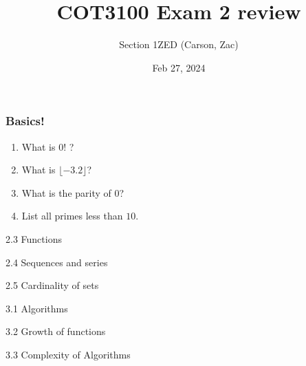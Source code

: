 \documentclass{beamer}
\title{COT3100 Exam 2 review}
\author{Section 1ZED (Carson, Zac)}
\date{Feb 27, 2024}
\begin{document}
\frame{\titlepage}

\begin{frame}
\frametitle{Basics!}

\begin{enumerate}
    \item<1-> What is $0!$ ?
    \item<2-> What is $\lfloor -3.2 \rfloor$?
    \item<3-> What is the parity of $0$?
    \item<4-> List all primes less than $10$.
\end{enumerate}

\end{frame}

\begin{frame}{2.3 Functions}

\end{frame}

\begin{frame}{2.4 Sequences and series}

\end{frame}

\begin{frame}{2.5 Cardinality of sets}

\end{frame}

\begin{frame}{3.1 Algorithms}

\end{frame}

\begin{frame}{3.2 Growth of functions}

\end{frame}

\begin{frame}{3.3 Complexity of Algorithms}
    
\end{frame}
\end{document}

